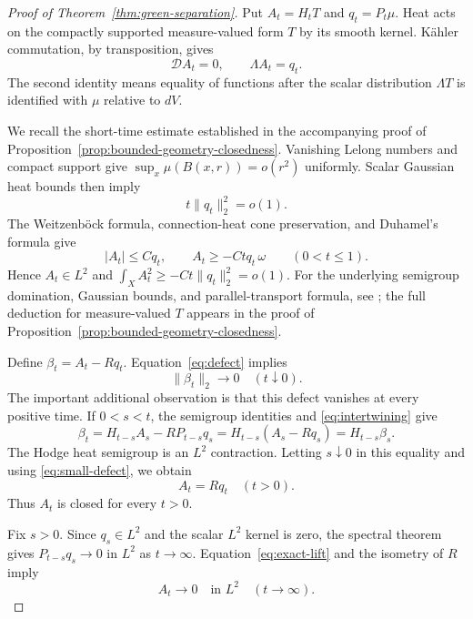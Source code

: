 \documentclass[11pt]{article}
\theoremstyle{remark}
\newcommand{\D}{\mathcal D}
\begin{document}
\begin{proof}[Proof of Theorem~\ref{thm:green-separation}]
Put $A_t=H_tT$ and $q_t=P_t\mu$. Heat acts on the compactly
supported measure-valued form $T$ by its smooth kernel. K\"ahler
commutation, by transposition, gives
\[
 \D A_t=0,\qquad \Lambda A_t=q_t.
\]
The second identity means equality of functions after the scalar
distribution $\Lambda T$ is identified with $\mu$ relative to $dV$.

We recall the short-time estimate established in the accompanying
proof of Proposition~\ref{prop:bounded-geometry-closedness}. Vanishing Lelong numbers and
compact support give
$\sup_x\mu(B(x,r))=o(r^2)$ uniformly. Scalar Gaussian heat bounds
then imply
\[
 t\|q_t\|_2^2=o(1).
\]
The Weitzenb\"ock formula, connection-heat cone preservation, and
Duhamel's formula give
\[
 |A_t|\leq Cq_t,
 \qquad A_t\geq-Ctq_t\,\omega\qquad(0<t\leq1).
\]
Hence $A_t\in L^2$ and
$\int_XA_t^2\geq-Ct\|q_t\|_2^2=o(1)$.
For the underlying semigroup domination, Gaussian bounds, and
parallel-transport formula, see
\cite[Introduction and Lemmas~3.6--3.7]{BDG}; the full deduction for measure-valued $T$ appears in the proof of Proposition~\ref{prop:bounded-geometry-closedness}.

Define $\beta_t=A_t-Rq_t$. Equation~\eqref{eq:defect} implies
\begin{equation}\label{eq:small-defect}
 \|\beta_t\|_2\longrightarrow0\quad(t\downarrow0).
\end{equation}
The important additional observation is that this defect vanishes
at every positive time. If $0<s<t$, the semigroup identities and
\eqref{eq:intertwining} give
\[
 \beta_t=H_{t-s}A_s-RP_{t-s}q_s
         =H_{t-s}(A_s-Rq_s)=H_{t-s}\beta_s.
\]
The Hodge heat semigroup is an $L^2$ contraction. Letting $s\downarrow0$
in this equality and using \eqref{eq:small-defect}, we obtain
\begin{equation}\label{eq:exact-lift}
 A_t=Rq_t\quad(t>0).
\end{equation}
Thus $A_t$ is closed for every $t>0$.

Fix $s>0$. Since $q_s\in L^2$ and the scalar $L^2$ kernel is zero,
the spectral theorem gives $P_{t-s}q_s\to0$ in $L^2$ as $t\to\infty$.
Equation~\eqref{eq:exact-lift} and the isometry of $R$ imply
\begin{equation}\label{eq:large-time}
 A_t\longrightarrow0\quad\text{in }L^2\quad(t\to\infty).
\end{equation}


\end{proof}
\end{document}
